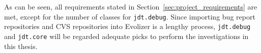 As can be seen, all requirements stated in Section~\ref{sec:project_requirements} are met, except for the number of classes for \texttt{jdt.debug}. Since importing bug report repositories and CVS repositories into Evolizer is a lengthy process, \texttt{jdt.debug} and \texttt{jdt.core} will be regarded adequate picks to perform the investigations in this thesis. 

